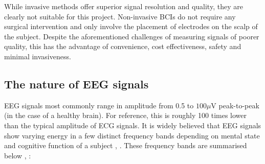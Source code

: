 While invasive methods offer superior signal resolution and quality, they are clearly not suitable for this project. Non-invasive BCIs do not require any surgical intervention and only involve the placement of electrodes on the scalp of the subject. Despite the aforementioned challenges of measuring signals of poorer quality, this has the advantage of convenience, cost effectiveness, safety and minimal invasiveness.

\subsection{The nature of EEG signals}
\label{subsection:nature-of-eeg-signals}
EEG signals most commonly range in amplitude from 0.5 to $100\mu$V peak-to-peak \cite{teplan-eeg-measurement} (in the case of a healthy brain). For reference, this is roughly 100 times lower than the typical amplitude of ECG signals. It is widely believed that EEG signals show varying energy in a few distinct frequency bands depending on mental state and cognitive function of a subject \cite{baillet-em-brain-mapping}, \cite{varnavas-phd}. These frequency bands are summarised below \cite{varnavas-phd}, \cite{bci-survey-nicolas-alonso}:

